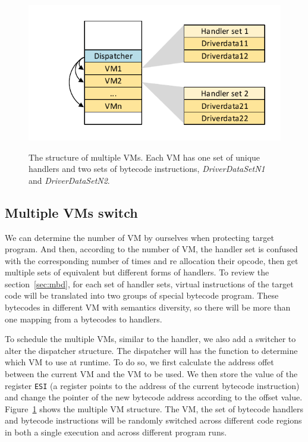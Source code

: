 \documentclass[preprint,12pt,3p]{elsarticle}
\newcommand\FIXME[1]{\textcolor{red}{FIX:}\textcolor{red}{#1}}
\begin{document}
\begin{figure}[!t]
  \centering
  \includegraphics[width=0.6\columnwidth]{figure/figmvm.pdf}\\
  \caption{The structure of multiple VMs. Each VM has one set of unique handlers and two sets of bytecode instructions, \emph{DriverDataSetN1} and \emph{DriverDataSetN2}.}\label{fig:Fig.mvm}
\end{figure}


\subsection{Multiple VMs switch}
We can determine the number of VM by ourselves when protecting target program.
And then, according to the number of VM, the handler set is confused with the corresponding number of times
and re allocation their opcode, then get multiple sets of equivalent but different forms of handlers.
To review the section~\ref{sec:mbd}, for each set of handler sets,
virtual instructions of the target code will be translated into two groups of special bytecode program.
These bytecodes in different VM with semantics diversity,
so there will be more than one mapping from a bytecodes to handlers.


To schedule the multiple VMs, similar to the handler, we also add a switcher to alter the dispatcher structure.
The dispatcher will has the function to determine which VM to use at runtime.
To do so, we first calculate the address offet between the current VM and the VM to be used.
We then store the value of the register \texttt{ESI} (a register points to the address of the current bytecode instruction)
and change the pointer of the new bytecode address according to the offset value.
Figure~\ref{fig:Fig.mvm} shows the multiple VM structure.
The VM, the set of bytecode handlers and bytecode instructions will be randomly switched
across different code regions in both a single execution and across different program runs.
\end{document}
